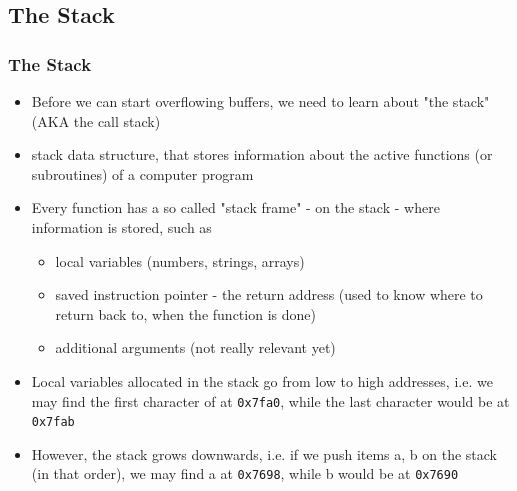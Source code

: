 \documentclass[aspectratio=169]{beamer}
\newcommand{\hex}[1]{\texttt{0x#1}}
\begin{document}
\subsection{The Stack}
\begin{frame}[fragile]
    \frametitle{The Stack}
    \begin{itemize}
        \item Before we can start overflowing buffers, we need to learn about "the stack" (AKA the call stack)
        \item stack data structure, that stores information about the active functions (or subroutines) of a computer program
        \item Every function has a so called "stack frame" - on the stack - where information is stored, such as
        \begin{itemize}
            \item local variables (numbers, strings, arrays)
            \item saved instruction pointer - the return address (used to know where to return back to, when the function is done)
            \item additional arguments (not really relevant yet)
        \end{itemize}
        \item Local variables allocated in the stack go from low to high addresses, i.e. we may find the first character of  at \hex{7fa0}, while the last character would be at \hex{7fab}
        \item However, the stack grows downwards, i.e. if we push items a, b on the stack (in that order), we may find a at \hex{7698}, while b would be at \hex{7690}
    \end{itemize}

\end{frame}
\end{document}
